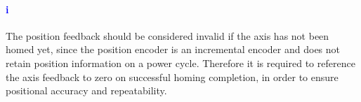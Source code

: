 \paragraph{\textbf{\LARGE \textcolor{blue}{i}}}The position feedback should be considered invalid if the axis has not been homed yet, since the position encoder is an incremental encoder and does not retain position information on a power cycle. Therefore it is required to reference the axis feedback to zero on successful homing completion, in order to ensure positional accuracy and repeatability.
